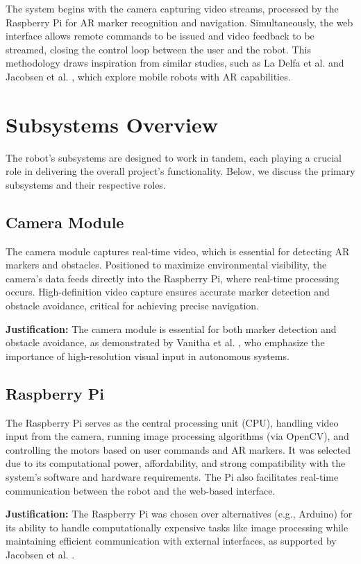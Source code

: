 The system begins with the camera capturing video streams, processed by the Raspberry Pi for AR marker recognition and navigation. Simultaneously, the web interface allows remote commands to be issued and video feedback to be streamed, closing the control loop between the user and the robot. This methodology draws inspiration from similar studies, such as La Delfa et al. \cite{delfa2015} and Jacobsen et al. \cite{jacobsen2018}, which explore mobile robots with AR capabilities.

\section{\label{sec:subsystems} Subsystems Overview}
The robot's subsystems are designed to work in tandem, each playing a crucial role in delivering the overall project’s functionality. Below, we discuss the primary subsystems and their respective roles.

\subsection{\label{subsec:camera} Camera Module}
The camera module captures real-time video, which is essential for detecting AR markers and obstacles. Positioned to maximize environmental visibility, the camera's data feeds directly into the Raspberry Pi, where real-time processing occurs. High-definition video capture ensures accurate marker detection and obstacle avoidance, critical for achieving precise navigation.

\textbf{Justification:} The camera module is essential for both marker detection and obstacle avoidance, as demonstrated by Vanitha et al. \cite{vanitha2016}, who emphasize the importance of high-resolution visual input in autonomous systems.

\subsection{\label{subsec:raspberry} Raspberry Pi}
The Raspberry Pi serves as the central processing unit (CPU), handling video input from the camera, running image processing algorithms (via OpenCV), and controlling the motors based on user commands and AR markers. It was selected due to its computational power, affordability, and strong compatibility with the system’s software and hardware requirements. The Pi also facilitates real-time communication between the robot and the web-based interface.

\textbf{Justification:} The Raspberry Pi was chosen over alternatives (e.g., Arduino) for its ability to handle computationally expensive tasks like image processing while maintaining efficient communication with external interfaces, as supported by Jacobsen et al. \cite{jacobsen2018}.


